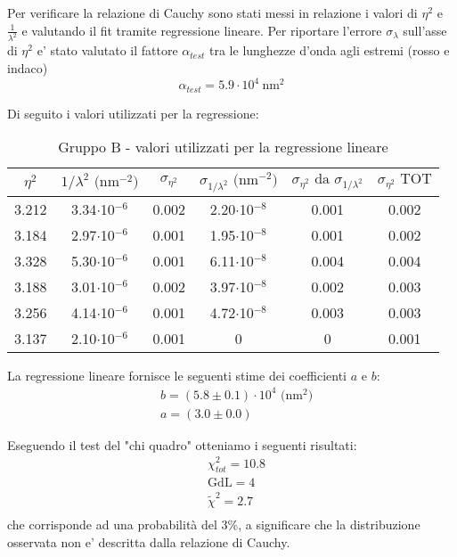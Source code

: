 Per verificare la relazione di Cauchy sono stati messi in relazione i valori di $\eta^2$ e $\frac{1}{\lambda^2}$
e valutando il fit tramite regressione lineare.
Per riportare l'errore $\sigma_{\lambda}$ sull'asse di $\eta^2$ e' stato valutato il fattore $\alpha_{test}$ tra le lunghezze d'onda agli estremi (rosso e indaco)
\[
    \alpha_{test} = 5.9 \cdot 10^4 \ \text{nm$^2$}
\]

Di seguito i valori utilizzati per la regressione:
\begin{table}[!htbp]
    {\par\centering
    \begin{tabular}{cccccc}
        \hline
            $\eta^2$ &
            $1/\lambda^2 \text{ (nm$^{-2}$)}$ &
            $\sigma_{\eta^2}$ &
            $\sigma_{1/\lambda^2} \text{ (nm$^{-2}$)}$ &
            $\sigma_{\eta^2} \text{ da } \sigma_{1/\lambda^2}$ &
            $\sigma_{\eta^2} \text{ TOT}$ \\
        \hline
        3.212   &   3.34$\cdot$10$^{-6}$  & 0.002 &  2.20$\cdot$10$^{-8}$ &   0.001 & 0.002\\
        3.184   &   2.97$\cdot$10$^{-6}$  & 0.001 &  1.95$\cdot$10$^{-8}$ &   0.001 & 0.002\\
        3.328   &   5.30$\cdot$10$^{-6}$  & 0.001 &  6.11$\cdot$10$^{-8}$ &   0.004 & 0.004\\
        3.188   &   3.01$\cdot$10$^{-6}$  & 0.002 &  3.97$\cdot$10$^{-8}$ &   0.002 & 0.003\\
        3.256   &   4.14$\cdot$10$^{-6}$  & 0.001 &  4.72$\cdot$10$^{-8}$ &   0.003 & 0.003\\
        3.137   &   2.10$\cdot$10$^{-6}$  & 0.001 &  0                    &   0     & 0.001\\
        \hline
    \end{tabular}
    \par}
    \caption{Gruppo B - valori utilizzati per la regressione lineare}
\end{table}

La regressione lineare fornisce le seguenti stime dei coefficienti $a$ e $b$:
\begin{align*}
    &b = (5.8 \pm 0.1) \cdot 10^4 \text{ (nm$^2$)} \\
    &a = (3.0 \pm 0.0)
\end{align*}

Eseguendo il test del "chi quadro" otteniamo i seguenti risultati:
\begin{align*}
    &\chi_{tot}^2 = 10.8\\
    &\text{GdL} = 4 \\
    &\tilde{\chi}^2= 2.7 \\
\end{align*}
che corrisponde ad una probabilità del 3\%, a significare che la distribuzione osservata non e' descritta dalla relazione di Cauchy.


